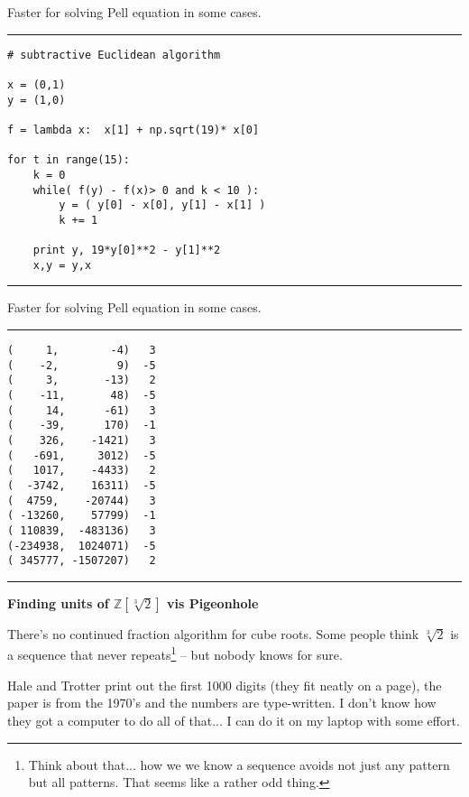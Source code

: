 \documentclass[12pt]{article}
\begin{document}
\newpage

\noindent Faster for solving Pell equation in some cases. 
\vspace{6pt}
\hrule

\begin{verbatim}
# subtractive Euclidean algorithm

x = (0,1)
y = (1,0)

f = lambda x:  x[1] + np.sqrt(19)* x[0]

for t in range(15):
    k = 0
    while( f(y) - f(x)> 0 and k < 10 ):
        y = ( y[0] - x[0], y[1] - x[1] )
        k += 1 
    
    print y, 19*y[0]**2 - y[1]**2
    x,y = y,x
\end{verbatim}
\vspace{6pt}
\hrule
\vspace{6pt}

\newpage

\noindent Faster for solving Pell equation in some cases. 
\vspace{6pt}
\hrule

\begin{verbatim}
(     1,        -4)   3
(    -2,         9)  -5
(     3,       -13)   2
(    -11,       48)  -5
(     14,      -61)   3
(    -39,      170)  -1
(    326,    -1421)   3
(   -691,     3012)  -5
(   1017,    -4433)   2
(  -3742,    16311)  -5
(  4759,    -20744)   3
( -13260,    57799)  -1
( 110839,  -483136)   3
(-234938,  1024071)  -5
( 345777, -1507207)   2
\end{verbatim}
\vspace{6pt}
\hrule
\vspace{6pt}



\newpage

\noindent \textbf{Finding units of $\mathbb{Z}[\sqrt[3]{2}]$ vis Pigeonhole} \newline

\noindent There's no continued fraction algorithm for cube roots.  Some people think $\sqrt[3]{2}$ is a sequence that never repeats\footnote{Think about that... how we we know a sequence avoids not just any pattern but all patterns.  That seems like a rather odd thing.} -- but nobody knows for sure. \newline

\noindent Hale and Trotter print out the first 1000 digits (they fit neatly on a page), the paper is from the 1970's and the numbers are type-written.  I don't know how they got a computer to do all of that... I can do it on my laptop with some effort. \newline
\end{document}
